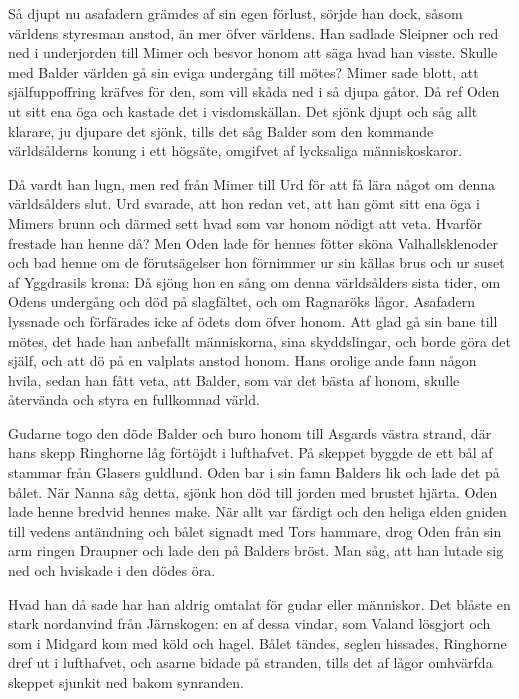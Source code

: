 Så djupt nu asafadern grämdes af sin egen förlust, sörjde
han dock, såsom världens styresman anstod, än mer öfver världens. Han
sadlade Sleipner och red ned i underjorden till Mimer och besvor honom
att säga hvad han visste. Skulle med Balder världen gå sin eviga
undergång till mötes? Mimer sade blott, att själfuppoffring kräfves för
den, som vill skåda ned i så djupa gåtor. Då ref Oden ut sitt ena öga
och kastade det i visdomskällan. Det sjönk djupt och såg allt klarare,
ju djupare det sjönk, tills det såg Balder som den kommande
världsålderns konung i ett högsäte, omgifvet af lycksaliga
människoskaror.

Då vardt han lugn, men red från Mimer till Urd för att få lära något om
denna världsålders slut. Urd svarade, att hon redan vet, att han gömt
sitt ena öga i Mimers brunn och därmed sett hvad som var honom nödigt
att veta. Hvarför frestade han henne då? Men Oden lade för hennes fötter
sköna Valhallsklenoder och bad henne om de förutsägelser hon förnimmer
ur sin källas brus och ur suset af Yggdrasils krona: Då sjöng hon en
sång om denna världsålders sista tider, om Odens undergång och död på
slagfältet, och om Ragnaröks lågor. Asafadern lyssnade och förfärades
icke af ödets dom öfver honom. Att glad gå sin bane till mötes, det hade
han anbefallt människorna, sina skyddslingar, och borde göra det själf,
och att dö på en valplats anstod honom. Hans orolige ande fann någon
hvila, sedan han fått veta, att Balder, som var det bästa af honom,
skulle återvända och styra en fullkomnad värld.

Gudarne togo den döde Balder och buro honom till Asgards västra strand,
där hans skepp Ringhorne låg förtöjdt i lufthafvet. På skeppet byggde de
ett bål af stammar från Glasers guldlund. Oden bar i sin famn Balders
lik och lade det på bålet. När Nanna såg detta, sjönk hon död till
jorden med brustet hjärta. Oden lade henne bredvid hennes make. När allt
var färdigt och den heliga elden gniden till vedens antändning och bålet
signadt med Tors hammare, drog Oden från sin arm ringen Draupner och
lade den på Balders bröst. Man såg, att han lutade sig ned och hviskade
i den dödes öra.

Hvad han då sade har han aldrig omtalat för gudar eller människor. Det
blåste en stark nordanvind från Järnskogen: en af dessa vindar, som
Valand lösgjort och som i Midgard kom med köld och hagel. Bålet tändes,
seglen hissades, Ringhorne dref ut i lufthafvet, och asarne bidade på
stranden, tills det af lågor omhvärfda skeppet sjunkit ned bakom
synranden.


